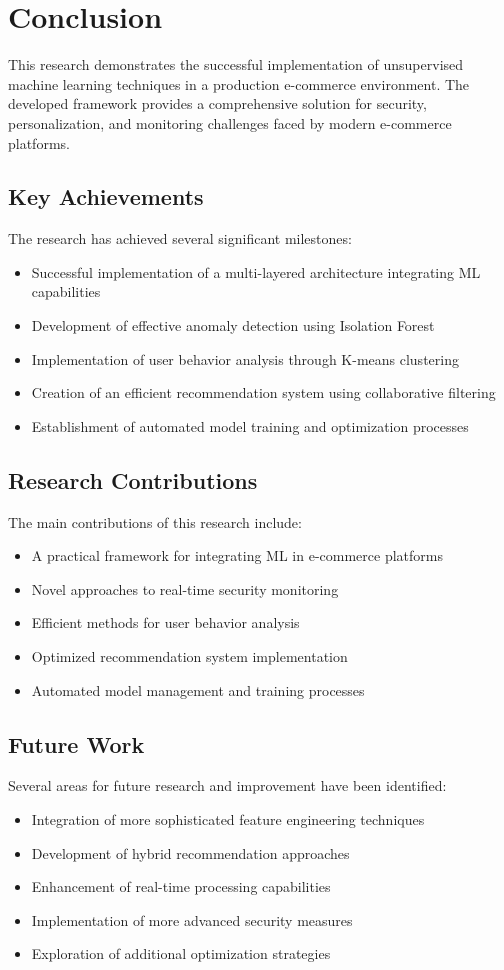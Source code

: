 \documentclass[12pt]{article}
\begin{document}
\section{Conclusion}
This research demonstrates the successful implementation of unsupervised machine learning techniques in a production e-commerce environment. The developed framework provides a comprehensive solution for security, personalization, and monitoring challenges faced by modern e-commerce platforms.

\subsection{Key Achievements}
The research has achieved several significant milestones:
\begin{itemize}
    \item Successful implementation of a multi-layered architecture integrating ML capabilities
    \item Development of effective anomaly detection using Isolation Forest
    \item Implementation of user behavior analysis through K-means clustering
    \item Creation of an efficient recommendation system using collaborative filtering
    \item Establishment of automated model training and optimization processes
\end{itemize}

\subsection{Research Contributions}
The main contributions of this research include:
\begin{itemize}
    \item A practical framework for integrating ML in e-commerce platforms
    \item Novel approaches to real-time security monitoring
    \item Efficient methods for user behavior analysis
    \item Optimized recommendation system implementation
    \item Automated model management and training processes
\end{itemize}

\subsection{Future Work}
Several areas for future research and improvement have been identified:
\begin{itemize}
    \item Integration of more sophisticated feature engineering techniques
    \item Development of hybrid recommendation approaches
    \item Enhancement of real-time processing capabilities
    \item Implementation of more advanced security measures
    \item Exploration of additional optimization strategies
\end{itemize}
\end{document}
